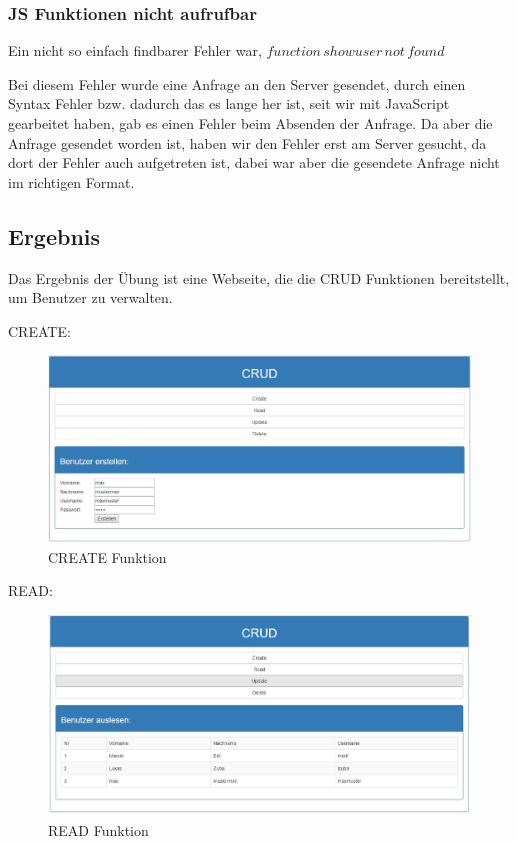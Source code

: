 \subsubsection{JS Funktionen nicht aufrufbar}
Ein nicht so einfach findbarer Fehler war, $ function\,showuser\,not\,found $ 

Bei diesem Fehler wurde eine Anfrage an den Server gesendet, durch einen Syntax Fehler bzw. dadurch das es lange her ist, seit wir mit JavaScript gearbeitet haben, gab es einen Fehler beim Absenden der Anfrage. Da aber die Anfrage gesendet worden ist, haben wir den Fehler erst am Server gesucht, da dort der Fehler auch aufgetreten ist, dabei war aber die gesendete Anfrage nicht im richtigen Format.


\subsection{Ergebnis}


Das Ergebnis der Übung ist eine Webseite, die die CRUD Funktionen bereitstellt, um Benutzer zu verwalten.

CREATE:
\begin{figure}[H]
	\centering
	\includegraphics[width=1\linewidth]{images/create}
	\caption{CREATE Funktion}
	\label{fig:create}
\end{figure}

READ:
\begin{figure}[H]
	\centering
	\includegraphics[width=0.9\linewidth]{images/read}
	\caption{READ Funktion}
	\label{fig:read}
\end{figure}

